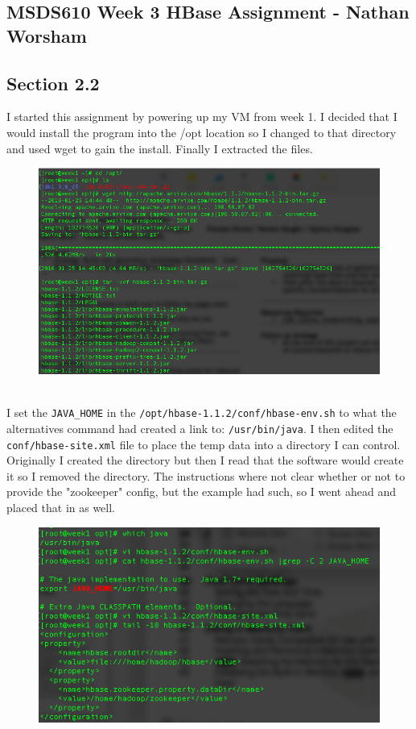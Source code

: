 \documentclass[10pt]{article}
\begin{document}
\subsection*{MSDS610 Week 3 HBase Assignment - Nathan Worsham}
\subsection*{Section 2.2}
I started this assignment by powering up my VM from week 1. I decided that I would install the program into the /opt location so I changed to that directory and used wget to gain the install. Finally I extracted the files. 
\begin{figure}[!h]
\includegraphics[scale=0.37]{hbase_download.png}
\centering
\end{figure}\\
I set the \verb|JAVA_HOME| in the \verb|/opt/hbase-1.1.2/conf/hbase-env.sh| to what the alternatives command had created a link to: \verb|/usr/bin/java|. I then edited the \verb|conf/hbase-site.xml| file to place the temp data into a directory I can control. Originally I created the directory but then I read that the software would create it so I removed the directory. The instructions where not clear whether or not to provide the "zookeeper" config, but the example had such, so I went ahead and placed that in as well. 
\begin{figure}[!h]
\includegraphics[scale=0.37]{java_env.png}
\centering
\end{figure}\\
\end{document}
